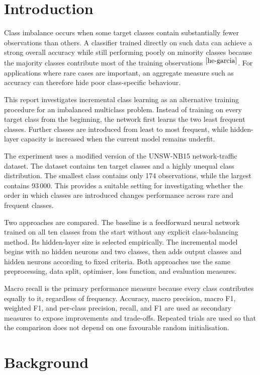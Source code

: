 \documentclass[conference]{IEEEtran}
\begin{document}
\section{Introduction}

Class imbalance occurs when some target classes contain substantially fewer observations than others. A classifier trained directly on such data can achieve a strong overall accuracy while still performing poorly on minority classes because the majority classes contribute most of the training observations $^{\cite{he-garcia}}$. For applications where rare cases are important, an aggregate measure such as accuracy can therefore hide poor class-specific behaviour.

This report investigates incremental class learning as an alternative training procedure for an imbalanced multiclass problem. Instead of training on every target class from the beginning, the network first learns the two least frequent classes. Further classes are introduced from least to most frequent, while hidden-layer capacity is increased when the current model remains underfit.

The experiment uses a modified version of the UNSW-NB15 network-traffic dataset. The dataset contains ten target classes and a highly unequal class distribution. The smallest class contains only 174 observations, while the largest contains 93\,000. This provides a suitable setting for investigating whether the order in which classes are introduced changes performance across rare and frequent classes.

Two approaches are compared. The baseline is a feedforward neural network trained on all ten classes from the start without any explicit class-balancing method. Its hidden-layer size is selected empirically. The incremental model begins with no hidden neurons and two classes, then adds output classes and hidden neurons according to fixed criteria. Both approaches use the same preprocessing, data split, optimiser, loss function, and evaluation measures.

Macro recall is the primary performance measure because every class contributes equally to it, regardless of frequency. Accuracy, macro precision, macro F1, weighted F1, and per-class precision, recall, and F1 are used as secondary measures to expose improvements and trade-offs. Repeated trials are used so that the comparison does not depend on one favourable random initialisation.

\section{Background}
\end{document}
